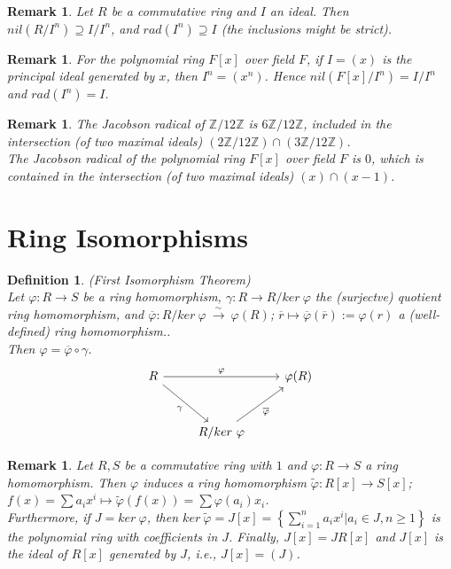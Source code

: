 \documentclass[a4paper,sfsidenotes,openany]{tufte-book}
\theoremstyle{theorem}
\newtheorem{definition}[theorem]{Definition}
\newtheorem{remark}[theorem]{Remark}
\begin{document}
\begin{fullwidth}
\begin{remark}
Let $R$ be a commutative ring and $I$ an ideal. Then $nil(R/I^n) \supseteq I/I^n$, and $rad(I^n) \supseteq I$ (the inclusions might be strict).
\end{remark}
\>

\begin{remark}
For the polynomial ring $F[x]$ over field $F$, if $I=(x)$ is the principal ideal generated by $x$, then $I^n = (x^n)$. Hence $nil(F[x]/I^n)=I/I^n$	and $rad(I^n) = I$.
\end{remark}
\>

\begin{remark}
The Jacobson radical of $\mathbb{Z}/12\mathbb{Z}$ is $6\mathbb{Z}/12\mathbb{Z}$, included in the intersection (of two maximal ideals) $(2\mathbb{Z}/12\mathbb{Z}) \cap (3\mathbb{Z}/12\mathbb{Z})$.\\
The Jacobson radical of the polynomial ring $F[x]$ over field $F$ is $0$, which is contained in the intersection (of two maximal ideals) $(x) \cap (x-1)$.\\
\end{remark}
\>

\section{Ring Isomorphisms}

\begin{definition}
\textit{{\color{blue} (First Isomorphism Theorem)}}\\
Let $\varphi: R \rightarrow S$ be a ring homomorphism, $\gamma: R \rightarrow R/ker \ \varphi$ the (surjectve) quotient ring homomorphism, and $\overline{\varphi}: R/ker \ \varphi \ \xrightarrow{\sim} \ \varphi(R)$; $\overline{r} \mapsto \overline{\varphi}(\overline{r}) := \varphi(r)$ a (well-defined) ring homomorphism..\\
Then $\varphi = \overline{\varphi} \circ \gamma$.\\
\begin{equation}\label{diagram}
\begin{tikzcd}
R \arrow{rr}{\varphi} \arrow[swap]{dr}{\gamma} & & \varphi(R) \\[10pt]
    & R/ker \ \varphi \arrow[swap]{ur}{\overline{\varphi}}
\end{tikzcd}
\end{equation}	
\end{definition}
\>

\begin{remark}
Let $R, S$ be a commutative ring with $1$ and $\varphi: R \rightarrow S$ a ring homomorphism. Then $\varphi$ induces a ring homomorphism $\tilde{\varphi}: R[x] \rightarrow S[x]$; $f(x)=\sum a_i x^i \mapsto \widetilde{\varphi}(f(x)) = \sum \varphi(a_i) x_i$.\\
Furthermore, if $J=ker \ \varphi$, then $ker \ \widetilde{\varphi} = J[x] = \left\{\sum_{i=1}^{n} a_i x^i | a_i \in J, n \geq 1 \right\}$	is the polynomial ring with coefficients in $J$.
Finally, $J[x] = J R[x]$ and $J[x]$ is the ideal of $R[x]$ generated by $J$, i.e., $J[x] = (J)$.\\
\end{remark}
\>


\end{fullwidth}
\end{document}
